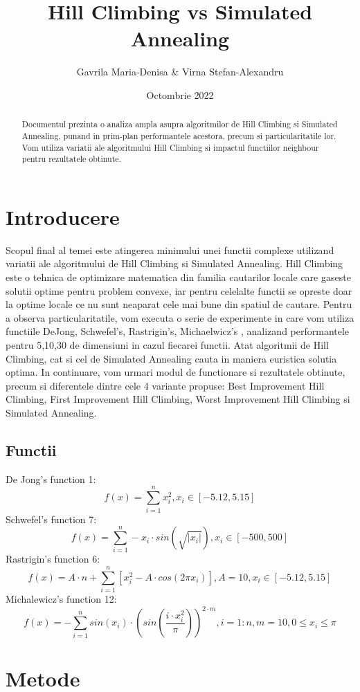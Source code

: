 \documentclass{article}
\title{Hill Climbing vs Simulated Annealing}
\author{Gavrila Maria-Denisa & Virna Stefan-Alexandru}
\date{Octombrie 2022}
\begin{document}
\maketitle
 \begin{abstract}
    Documentul prezinta o analiza ampla asupra algoritmilor de Hill Climbing si Simulated Annealing, punand in prim-plan performantele acestora, precum si particularitatile lor. Vom utiliza variatii ale algoritmului Hill Climbing si impactul functiilor neighbour pentru rezultatele obtinute.
\end{abstract}

\section{Introducere}
Scopul final al temei este atingerea minimului unei functii complexe utilizand variatii ale algoritmului de Hill Climbing si Simulated Annealing. Hill Climbing este o tehnica de optimizare matematica din familia cautarilor locale care gaseste solutii optime pentru problem convexe, iar pentru celelalte functii se opreste doar la optime locale ce nu sunt neaparat cele mai bune din spatiul de cautare. Pentru a observa particularitatile, vom executa o serie de experimente in care vom utiliza functiile DeJong, Schwefel’s, Rastrigin’s, Michaelwicz’s , analizand performantele pentru 5,10,30 de dimensiuni in cazul fiecarei functii. Atat algoritmii de Hill Climbing, cat si cel de Simulated Annealing cauta in maniera euristica solutia optima. In continuare, vom urmari modul de functionare si rezultatele obtinute, precum si diferentele dintre cele 4 variante propuse: Best Improvement Hill Climbing, First Improvement Hill Climbing, Worst Improvement Hill Climbing si Simulated Annealing.

\subsection{Functii}
De Jong's function 1\cite{DeJong}:
$$ f(x) = \sum_{i=1}^n x_i^2,
x_i \in \left[ -5.12, 5.15 \right]$$
Schwefel's function 7\cite{Schwefel}:
$$ f(x) = \sum_{i=1}^n - x_i \cdot sin(\sqrt{|x_i|}),
x_i \in \left[ -500, 500 \right]$$
Rastrigin's function 6\cite{Rastrigin}:
$$ f(x) = A \cdot n + \sum_{i=1}^n \left[ x_i^2 - A \cdot cos(2 \pi x_i) \right],
A = 10, x_i \in \left[ -5.12, 5.15 \right]$$
Michalewicz's function 12\cite{Michalewicz}:
$$ f(x) = -\sum_{i=1}^n sin(x_i) \cdot(sin(\frac{i \cdot x_i^2}{\pi}))^{2 \cdot m},
i=1:n, m=10, 0 \le x_i \le \pi$$
\section{Metode}
\end{document}
